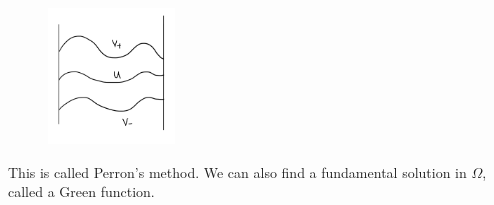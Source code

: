 \begin{figure}[H]
    \centering
    \includegraphics[width=0.3\textwidth]{Pics/22-3.png}
\end{figure}
This is called Perron's method. We can also find a fundamental solution in $\Omega$, called a Green function.